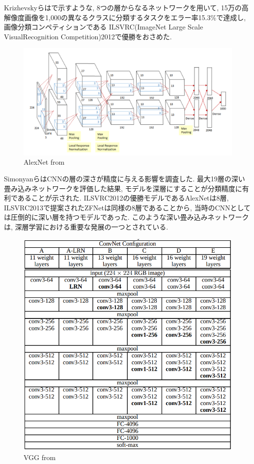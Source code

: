 Krizhevskyら\cite{AlexNet}はで示すような, 8つの層からなるネットワークを用いて, 15万の高解像度画像を1,000の異なるクラスに分類するタスクをエラー率15.3\%で達成し, 画像分類コンペティションである ILSVRC(ImageNet Large Scale VisualRecognition Competition)2012で優勝をおさめた.
\begin{figure}[hbtp]
  \centering
 \includegraphics[keepaspectratio, scale=0.55]
      {images/AlexNet.png}
 \caption{AlexNet from \cite{AlexNet}}
 \label{Fig:AlexNet}
\end{figure}
\newpage
\par SimonyanらはCNNの層の深さが精度に与える影響を調査した. 最大19層の深い畳み込みネットワークを評価した結果, モデルを深層にすることが分類精度に有利であることが示された.
ILSVRC2012の優勝モデルであるAlexNetは8層, ILSVRC2013で提案されたZFNetは同様の8層であることから, 当時のCNNとしては圧倒的に深い層を持つモデルであった. このような深い畳み込みネットワークは, 深層学習における重要な発展の一つとされている.
\begin{figure}[hbtp]
  \centering
 \includegraphics[keepaspectratio, scale=0.5]
      {images/VGG.png}
 \caption{VGG from \cite{AlexNet}}
 \label{Fig:VGG}
\end{figure}


